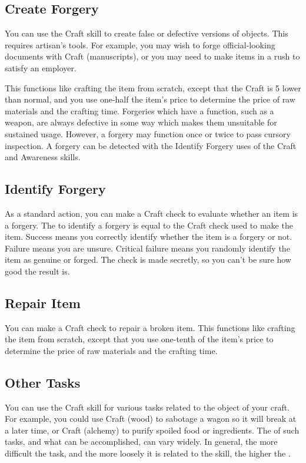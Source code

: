     \subsection{Create Forgery}
        You can use the Craft skill to create false or defective versions of objects.
        This requires artisan's tools.
        For example, you may wish to forge official-looking documents with Craft (manuscripts), or you may need to make items in a rush to satisfy an employer.

        This functions like crafting the item from scratch, except that the Craft  is 5 lower than normal, and you use one-half the item's price to determine the price of raw materials and the crafting time.
        Forgeries which have a function, such as a weapon, are always defective in some way which makes them unsuitable for sustained usage.
        However, a forgery may function once or twice to pass cursory inspection.
        A forgery can be detected with the Identify Forgery uses of the Craft and Awareness skills.

    \subsection{Identify Forgery}
        As a standard action, you can make a Craft check to evaluate whether an item is a forgery. The  to identify a forgery is equal to the Craft check used to make the item. Success means you correctly identify whether the item is a forgery or not. Failure means you are unsure. Critical failure means you randomly identify the item as genuine or forged. The check is made secretly, so you can't be sure how good the result is.

    \subsection{Repair Item}
        You can make a Craft check to repair a broken item. This functions like crafting the item from scratch, except that you use one-tenth of the item's price to determine the price of raw materials and the crafting time.

    \subsection{Other Tasks}
        You can use the Craft skill for various tasks related to the object of your craft. For example, you could use Craft (wood) to sabotage a wagon so it will break at a later time, or Craft (alchemy) to purify spoiled food or ingredients. The  of such tasks, and what can be accomplished, can vary widely. In general, the more difficult the task, and the more loosely it is related to the skill, the higher the .


